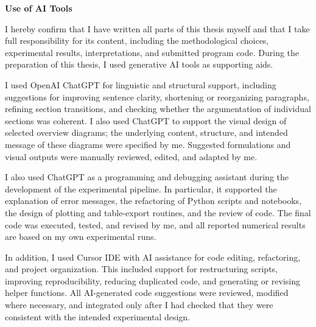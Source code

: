 \documentclass[12pt]{article}
\begin{document}
\newpage
    

\RaggedRight


\newpage


\clearpage
\Large
\noindent
\textbf{Use of AI Tools}
\vspace{0.5cm}

\noindent
\normalsize

I hereby confirm that I have written all parts of this thesis myself and that I
take full responsibility for its content, including the methodological choices,
experimental results, interpretations, and submitted program code. During the
preparation of this thesis, I used generative AI tools as supporting aids.

I used OpenAI ChatGPT for linguistic and structural support, including suggestions
for improving sentence clarity, shortening or reorganizing paragraphs, refining
section transitions, and checking whether the argumentation of individual sections
was coherent. I also used ChatGPT to support the visual design of selected
overview diagrams; the underlying content, structure, and intended message of
these diagrams were specified by me. Suggested formulations and visual outputs
were manually reviewed, edited, and adapted by me.

I also used ChatGPT as a programming and debugging assistant during the development
of the experimental pipeline. In particular, it supported the explanation of error
messages, the refactoring of Python scripts and notebooks, the design of plotting
and table-export routines, and the review of code. The final code was executed, tested, and revised by me, and all
reported numerical results are based on my own experimental runs.

In addition, I used Cursor IDE with AI assistance for code editing, refactoring,
and project organization. This included support for restructuring scripts,
improving reproducibility, reducing duplicated code, and generating or revising
helper functions. All AI-generated code suggestions were reviewed, modified where
necessary, and integrated only after I had checked that they were consistent with
the intended experimental design.
\end{document}
